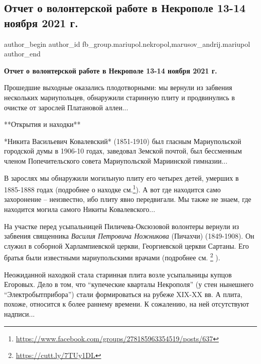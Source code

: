  
 
 
 
 

\subsection{Отчет о волонтерской работе в Некрополе 13-14 ноября 2021 г.}
\label{sec:20_11_2021.fb.fb_group.mariupol.nekropol.1.otchet_volonter_rabota_13_14_nojabrja}
 
\ifcmt
 author_begin
   author_id fb_group.mariupol.nekropol,marusov_andrij.mariupol
 author_end
\fi

\textbf{Отчет о волонтерской работе в Некрополе 13-14 ноября 2021 г.}

Прошедшие выходные оказались плодотворными: мы вернули из забвения нескольких
мариупольцев, обнаружили старинную плиту и продвинулись в очистке от зарослей
Платановой аллеи...

**Открытия и находки**

*Никита Васильевич Ковалевский* (1851-1910) был гласным Мариупольской городской
думы в 1906-10 годах, заведовал Земской почтой, был бессменным членом
Попечительского совета Мариупольской Мариинской гимназии...

В зарослях мы обнаружили могильную плиту его четырех детей, умерших в 1885-1888
годах (подробнее о находке
см.\footnote{\url{https://www.facebook.com/groups/278185963354519/posts/637}}).
А вот где находится само захоронение – неизвестно, ибо плиту явно передвигали.
Мы также не знаем, где находится могила самого Никиты Ковалевского...

На участке перед усыпальницей Пиличева-Оксюзовой волонтеры вернули из забвения
священника \emph{Василия Петровича Ножникова} (Пичахчи) (1849-1908). Он служил в
соборной Харлампиевской церкви, Георгиевской церкви Сартаны. Его братья были
известными мариупольскими врачами (подробнее см. \footnote{\url{https://cutt.ly/7TUy1DL}} ).

Неожиданной находкой стала старинная плита возле усыпальницы купцов Егоровых.
Дело в том, что \enquote{купеческие кварталы Некрополя} (у стен нынешнего
\enquote{Электробытприбора}) стали формироваться на рубеже XIX-XX вв. А плита, похоже,
относится к более раннему времени. К сожалению, на ней отсутствуют надписи...

